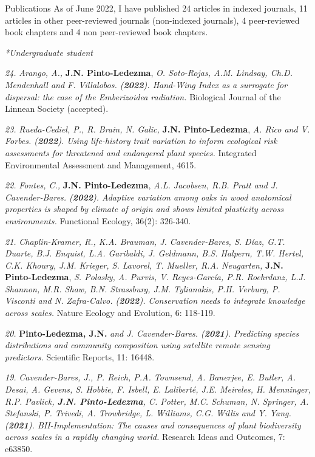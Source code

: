 \documentclass{resume} %
\begin{document}

\begin{rSection}{Publications}
As of June 2022, I have published 24 articles in indexed journals, 11 articles in other peer-reviewed journals (non-indexed journals), 4 peer-reviewed book chapters and 4 non peer-reviewed book chapters.

\em{*Undergraduate student}

{\em 24.} {\em Arango, A.,} {\bf{J.N. Pinto-Ledezma}}, {\em O. Soto-Rojas, A.M. Lindsay, Ch.D. Mendenhall and F. Villalobos. ({\bf{2022}}). Hand-Wing Index as a surrogate for dispersal: the case of the Emberizoidea radiation.} {Biological Journal of the Linnean Society (accepted).}

{\em 23.} {\em Rueda-Cediel, P., R. Brain, N. Galic, } {\bf{J.N. Pinto-Ledezma}}, {\em A. Rico and V. Forbes. ({\bf{2022}}). Using life-history trait variation to inform ecological risk assessments for threatened and endangered plant species.} {Integrated Environmental Assessment and Management, 4615.}

{\em 22.} {\em Fontes, C.,} {\bf{J.N. Pinto-Ledezma}}, {\em A.L. Jacobsen, R.B. Pratt and J. Cavender-Bares. ({\bf{2022}}). Adaptive variation among oaks in wood anatomical properties is shaped by climate of origin and shows limited plasticity across environments.} {Functional Ecology, 36(2): 326-340.}

{\em 21.} {\em Chaplin-Kramer, R., K.A. Brauman, J. Cavender-Bares, S. Díaz, G.T. Duarte, B.J. Enquist, L.A. Garibaldi, J. Geldmann, B.S. Halpern, T.W. Hertel, C.K. Khoury, J.M. Krieger, S. Lavorel, T. Mueller, R.A. Neugarten,} {\bf{J.N. Pinto-Ledezma}}, {\em S. Polasky, A. Purvis, V. Reyes-García, P.R. Roehrdanz, L.J. Shannon, M.R. Shaw, B.N. Strassburg, J.M. Tylianakis, P.H. Verburg, P. Visconti and N. Zafra-Calvo. ({\bf{2022}}). Conservation needs to integrate knowledge across scales.} {Nature Ecology and Evolution, 6: 118-119.}

{\em 20.} {\bf{Pinto-Ledezma, J.N.}} {\em and J. Cavender-Bares. ({{\bf 2021}}). Predicting species distributions and community composition using satellite remote sensing predictors.} {Scientific Reports, 11: 16448.}

{\em 19.} {\em Cavender-Bares, J., P. Reich, P.A. Townsend, A. Banerjee, E. Butler, A. Desai, A. Gevens, S. Hobbie, F. Isbell, E. Laliberté, J.E. Meireles, H. Menninger, R.P. Pavlick, {\bf{J.N. Pinto-Ledezma}}, C. Potter, M.C. Schuman, N. Springer, A. Stefanski, P. Trivedi, A. Trowbridge, L. Williams, C.G. Willis and Y. Yang. ({{\bf 2021}}). BII-Implementation: The causes and consequences of plant biodiversity across scales in a rapidly changing world.} {Research Ideas and Outcomes, 7: e63850}. 


\end{rSection}
\end{document}
